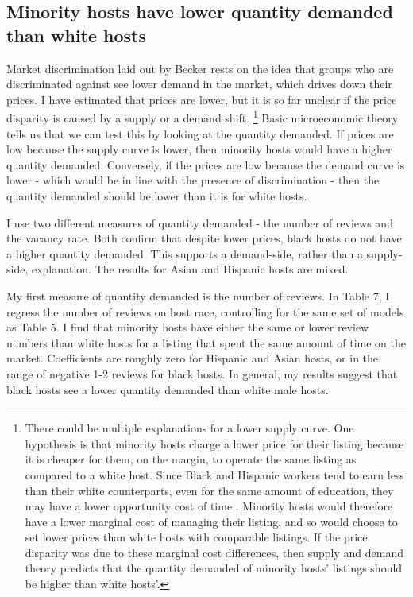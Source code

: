 \subsection{Minority hosts have lower quantity demanded than white hosts}

Market discrimination laid out by Becker rests on the idea that groups who are discriminated against see lower demand in the market, which drives down their prices. I have estimated that prices are lower, but it is so far unclear if the price disparity is caused by a supply or a demand shift.%
	\footnote{There could be multiple explanations for a lower supply curve. One hypothesis is that minority hosts charge a lower price for their listing because it is cheaper for them, on the margin, to operate the same listing as compared to a white host. Since Black and Hispanic workers tend to earn less than their white counterparts, even for the same amount of education, they may have a lower opportunity cost of time \citep{wages}. Minority hosts would therefore have a lower marginal cost of managing their listing, and so would choose to set lower prices than white hosts with comparable listings. If the price disparity was due to these marginal cost differences, then supply and demand theory predicts that the quantity demanded of minority hosts' listings should be higher than white hosts'.}
Basic microeconomic theory tells us that we can test this by looking at the quantity demanded. If prices are low because the supply curve is lower, then minority hosts would have a higher quantity demanded. Conversely, if the prices are low because the demand curve is lower - which would be in line with the presence of discrimination - then the quantity demanded should be lower than it is for white hosts. 
 
I use two different measures of quantity demanded - the number of reviews and the vacancy rate. Both confirm that despite lower prices, black hosts do not have a higher quantity demanded. This supports a demand-side, rather than a supply-side, explanation. The results for Asian and Hispanic hosts are mixed. 

My first measure of quantity demanded is the number of reviews. In Table 7, I regress the number of reviews on host race, controlling for the same set of models as Table 5. I find that minority hosts have either the same or lower review numbers than white hosts for a listing that spent the same amount of time on the market. Coefficients are roughly zero for Hispanic and Asian hosts, or in the range of negative 1-2 reviews for black hosts. In general, my results suggest that black hosts see a lower quantity demanded than white male hosts.

